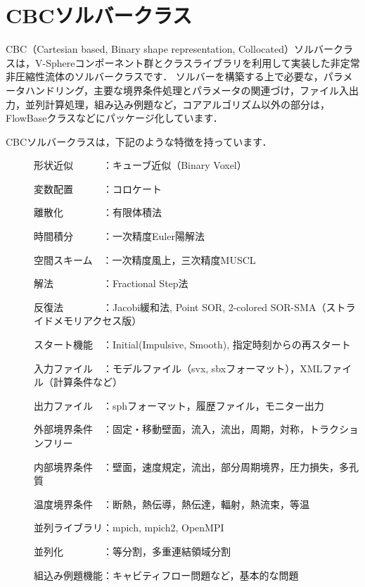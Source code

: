 %
\section{CBCソルバークラス}
CBC（Cartesian based, Binary shape representation, Collocated）ソルバークラスは，V-Sphereコンポーネント群とクラスライブラリを利用して実装した非定常非圧縮性流体のソルバークラスです．
ソルバーを構築する上で必要な，パラメータハンドリング，主要な境界条件処理とパラメータの関連づけ，ファイル入出力，並列計算処理，組み込み例題など，コアアルゴリズム以外の部分は，FlowBaseクラスなどにパッケージ化しています．

CBCソルバークラスは，下記のような特徴を持っています．

\begin{description}
\item[ ] 形状近似　　　：キューブ近似（Binary Voxel）
\item[ ] 変数配置　　　：コロケート
\item[ ] 離散化　　　　：有限体積法
\item[ ] 時間積分　　　：一次精度Euler陽解法%
\item[ ] 空間スキーム　：一次精度風上，三次精度MUSCL%
\item[ ] 解法　　　　　：Fractional Step法
\item[ ] 反復法　　　　：Jacobi緩和法, Point SOR, 2-colored SOR-SMA（ストライドメモリアクセス版）
\item[ ] スタート機能　：Initial(Impulsive, Smooth), 指定時刻からの再スタート
\item[ ] 入力ファイル　：モデルファイル（svx, sbxフォーマット），XMLファイル（計算条件など）
\item[ ] 出力ファイル　：sphフォーマット，履歴ファイル，モニター出力
\item[ ] 外部境界条件　：固定・移動壁面，流入，流出，周期，対称，トラクションフリー
\item[ ] 内部境界条件　：壁面，速度規定，流出，部分周期境界，圧力損失，多孔質
\item[ ] 温度境界条件　：断熱，熱伝導，熱伝達，輻射，熱流束，等温
\item[ ] 並列ライブラリ：mpich, mpich2, OpenMPI
\item[ ] 並列化　　　　：等分割，多重連結領域分割
\item[ ] 組込み例題機能：キャビティフロー問題など，基本的な問題
\end{description}

